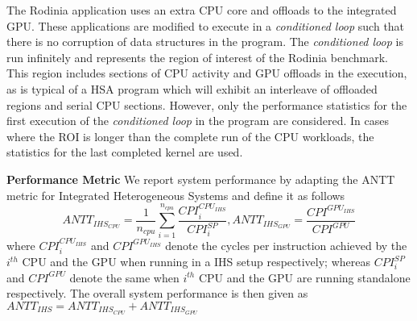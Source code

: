The Rodinia application uses an extra CPU core and offloads to the integrated GPU. These applications are modified to execute in a \textit{conditioned loop} such that there is no corruption of data structures in the program. The \textit{conditioned loop} is run infinitely and represents the region of interest of the Rodinia benchmark. This region includes sections of CPU activity and GPU offloads in the execution, as is typical of a HSA program which will exhibit an interleave of offloaded regions and serial CPU sections. However, only the performance statistics for the first execution of the \textit{conditioned loop} in the program are considered. In cases where the ROI is longer than the complete run of the CPU workloads, the statistics for the last completed kernel are used. 
\par \textbf{Performance Metric} We report system performance by adapting the ANTT \cite{antt} metric for Integrated Heterogeneous Systems and define it as follows
\begin{equation}
ANTT_{IHS_{CPU}} = \frac{1}{n_{cpu}} \sum_{i=1}^{n_{cpu}} \frac{CPI_i^{CPU_{IHS}}}{CPI_i^{SP}},
ANTT_{IHS_{GPU}} = \frac{CPI^{GPU_{IHS}}}{CPI^{GPU}}
\end{equation}
where ${CPI_i^{CPU_{IHS}}}$ and $CPI^{GPU_{IHS}}$ denote the cycles per instruction achieved by the $i^{th}$ CPU and the GPU when running in a IHS setup respectively; whereas $CPI_i^{SP}$ and $CPI^{GPU}$ denote the same when $i^{th}$ CPU and the GPU are running standalone respectively. The overall system performance is then given as $ANTT_{IHS} = ANTT_{IHS_{CPU}} + ANTT_{IHS_{GPU}} $

